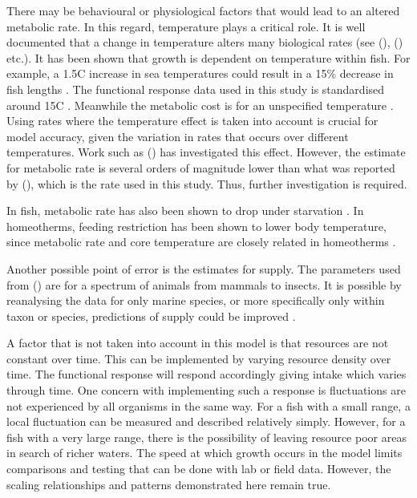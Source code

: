 \documentclass[a4paper, 11pt, hidelinks]{article} %
\begin{document}
	There may be behavioural or physiological factors that would lead to an altered metabolic rate.  
	In this regard, temperature plays a critical role.  It is well documented that a change in temperature alters many biological rates  (see \citeauthor{Peters1983} (\citeyear{Peters1983}), \citeauthor{Gillooly2001} (\citeyear{Gillooly2001}) etc.).  
	It has been shown that growth is dependent on temperature within fish. %
	For example, a 1.5\textdegree{}C increase in sea temperatures could result in a 15\% decrease in fish lengths \parencite{VanRijn2017}. %
	The functional response data used in this study is standardised around 15\textdegree{}C \parencite{Pawar2012}.
	Meanwhile the metabolic cost is for an unspecified temperature \parencite{Peters1983}.  Using rates where the temperature effect is taken into account is crucial for model accuracy, given the variation in rates that occurs over different temperatures.  Work such as \citeauthor{Barneche2014} (\citeyear{Barneche2014}) has investigated this effect.  However, the estimate for metabolic rate is several orders of magnitude lower than what was reported by \citeauthor{Peters1983} (\citeyear{Peters1983}), which is the rate used in this study.  Thus, further investigation is required.  %
	
	In fish, metabolic rate has also been shown to drop under starvation \parencite{Cook2000}.  In homeotherms, feeding restriction has been shown to lower body temperature, since metabolic rate and core temperature are closely related in homeotherms \parencite{Ballor1991, Blanc2003,}.  
	
	Another possible point of error is the estimates for supply.  The parameters used from \citeauthor{Pawar2012} (\citeyear{Pawar2012}) are for a spectrum of animals from mammals to insects.  It is possible by reanalysing the data for only marine species, or more specifically only within taxon or species, predictions of supply could be improved \parencite{Marshall2019}.  %
	
	A factor that is not taken into account in this model is that resources are not constant over time.  This can be implemented by varying resource density over time.  The functional response will respond accordingly giving intake which varies through time.  One concern with implementing such a response is fluctuations are not experienced by all organisms in the same way.  For a fish with a small range, a local fluctuation can be measured and described relatively simply.  However, for a fish with a very large range, there is the possibility of leaving resource poor areas in search of richer waters.
	The speed at which growth occurs in the model limits comparisons and testing that can be done with lab or field data.  However, the scaling relationships and patterns demonstrated here remain true.
\end{document}
